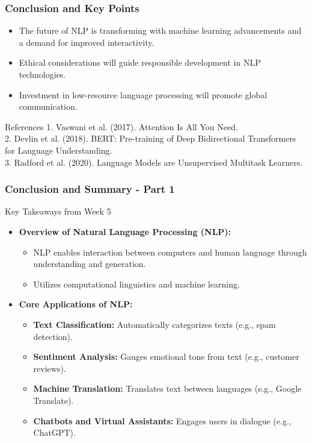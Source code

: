 \documentclass[aspectratio=169]{beamer}
\begin{document}
\begin{frame}[fragile]
    \frametitle{Conclusion and Key Points}
    \begin{itemize}
        \item The future of NLP is transforming with machine learning advancements and a demand for improved interactivity.
        \item Ethical considerations will guide responsible development in NLP technologies.
        \item Investment in low-resource language processing will promote global communication.
    \end{itemize}
    \begin{block}{References}
        1. Vaswani et al. (2017). Attention Is All You Need. \\
        2. Devlin et al. (2018). BERT: Pre-training of Deep Bidirectional Transformers for Language Understanding. \\
        3. Radford et al. (2020). Language Models are Unsupervised Multitask Learners.
    \end{block}
\end{frame}

\begin{frame}[fragile]
    \frametitle{Conclusion and Summary - Part 1}
    \begin{block}{Key Takeaways from Week 5}
        \begin{itemize}
            \item \textbf{Overview of Natural Language Processing (NLP):}
            \begin{itemize}
                \item NLP enables interaction between computers and human language through understanding and generation.
                \item Utilizes computational linguistics and machine learning.
            \end{itemize}
            
            \item \textbf{Core Applications of NLP:}
            \begin{itemize}
                \item \textbf{Text Classification:} Automatically categorizes texts (e.g., spam detection).
                \item \textbf{Sentiment Analysis:} Gauges emotional tone from text (e.g., customer reviews).
                \item \textbf{Machine Translation:} Translates text between languages (e.g., Google Translate).
                \item \textbf{Chatbots and Virtual Assistants:} Engages users in dialogue (e.g., ChatGPT).
            \end{itemize}
        \end{itemize}
    \end{block}
\end{frame}
\end{document}
